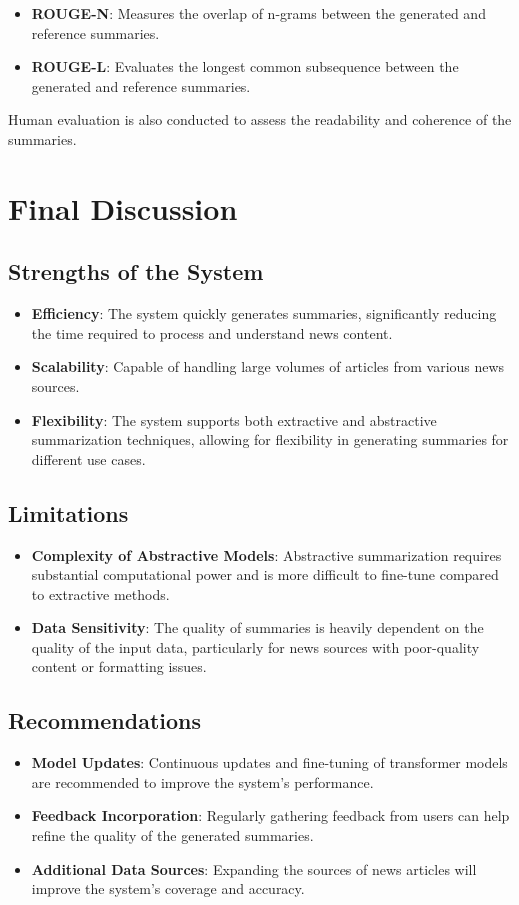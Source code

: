 \documentclass[12pt]{article}
\begin{document}
\begin{itemize}
    \item \textbf{ROUGE-N}: Measures the overlap of n-grams between the generated and reference summaries.
    \item \textbf{ROUGE-L}: Evaluates the longest common subsequence between the generated and reference summaries.
\end{itemize}

Human evaluation is also conducted to assess the readability and coherence of the summaries.

\section{Final Discussion}
\subsection{Strengths of the System}
\begin{itemize}
    \item \textbf{Efficiency}: The system quickly generates summaries, significantly reducing the time required to process and understand news content.
    \item \textbf{Scalability}: Capable of handling large volumes of articles from various news sources.
    \item \textbf{Flexibility}: The system supports both extractive and abstractive summarization techniques, allowing for flexibility in generating summaries for different use cases.
\end{itemize}

\subsection{Limitations}
\begin{itemize}
    \item \textbf{Complexity of Abstractive Models}: Abstractive summarization requires substantial computational power and is more difficult to fine-tune compared to extractive methods.
    \item \textbf{Data Sensitivity}: The quality of summaries is heavily dependent on the quality of the input data, particularly for news sources with poor-quality content or formatting issues.
\end{itemize}

\subsection{Recommendations}
\begin{itemize}
    \item \textbf{Model Updates}: Continuous updates and fine-tuning of transformer models are recommended to improve the system's performance.
    \item \textbf{Feedback Incorporation}: Regularly gathering feedback from users can help refine the quality of the generated summaries.
    \item \textbf{Additional Data Sources}: Expanding the sources of news articles will improve the system's coverage and accuracy.
\end{itemize}
\end{document}
